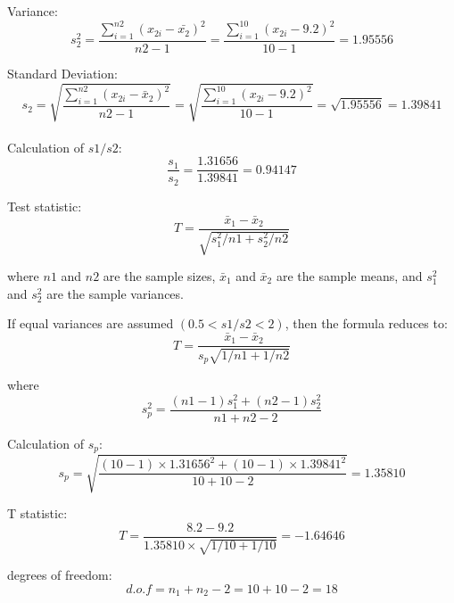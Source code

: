 \documentclass[a4paper,11pt,openright]{report}
\begin{document}
\begin{enumerate}
\hspace*{10mm} Variance:
\begin{equation*}
s_{2}^{2} = \frac{\sum\limits_{i=1}^{n2} (x_{2i} - \bar {x_{2}})^{2}}{n2 - 1}
= \frac{\sum\limits_{i=1}^{10} (x_{2i} - 9.2)^{2}}{10 -1} = 1.95556
\end{equation*}

\hspace*{10mm} Standard Deviation:
\begin{equation*}
s_{2} = \sqrt{\frac{\sum\limits_{i=1}^{n2} (x_{2i} - \bar x_{2})^{2}}{n2 - 1}}
= \sqrt{\frac{\sum\limits_{i=1}^{10} (x_{2i} - 9.2)^{2}}{10 -1}}
= \sqrt{1.95556} = 1.39841
\end{equation*} \\

Calculation of $s1/s2$:
\begin{equation*}
\frac{s_{1}}{s_{2}} = \frac{1.31656}{1.39841} = 0.94147
\end{equation*}

Test statistic: 
\begin{equation*}
T = \frac{\bar x_{1} - \bar x_{2}}{\sqrt{s_{1}^{2}/n1 + s_{2}^{2}/n2}}
\end{equation*}

where $n1$ and $n2$ are the sample sizes, $\bar x_{1}$ and $\bar x_{2}$ are the sample
means, and $s_{1}^{2}$ and $s_{2}^{2}$ are the sample variances. 

If equal variances are assumed $(0.5 < s1/s2 < 2)$, then the formula reduces to:
\begin{equation*}
T = \frac{\bar x_{1} - \bar x_{2}}{s_{p} \sqrt{1/n1 + 1/n2}}
\end{equation*}

where
\begin{equation*}
s_{p}^{2} = \frac{(n1-1)s_{1}^{2} + (n2-1)s_{2}^{2}}{n1+n2-2}
\end{equation*}

Calculation of $s_{p}$:
\begin{equation*}
s_{p} = \sqrt{\frac{(10-1) \times 1.31656^{2} + (10-1) \times 1.39841^{2}}{10+10-2}} 
      = 1.35810
\end{equation*}

T statistic:
\begin{equation*}
T = \frac{8.2 - 9.2}{1.35810 \times \sqrt{1/10 + 1/10}} = -1.64646
\end{equation*}

degrees of freedom:
\begin{equation*}
d.o.f = n_{1} + n_{2} - 2 = 10 + 10 - 2 = 18
\end{equation*}


\end{enumerate}
\end{document}
